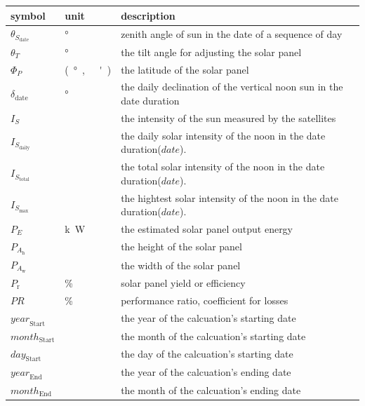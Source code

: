\documentclass[12pt]{article}
\begin{document}
\renewcommand{\arraystretch}{1.2}
\noindent \begin{longtable*}{l l p{12cm}} \toprule
  \textbf{symbol} & \textbf{unit} & \textbf{description}\\
\midrule 
$\theta_{S_{\text{date}}}$ & \si[per-mode=symbol] {\degree} & zenith angle of
sun in the date of a sequence of day
  \\
  $\theta_{T}$ & \si[per-mode=symbol] {\degree} & the tilt angle for adjusting
  the solar panel
  \\
  $\Phi_P$ & \si[per-mode=symbol] {(\degree, \ ')} & the latitude
   of the solar panel  
  \\
$\delta_{\text{date}}$ & \si[per-mode=symbol] {\degree} & the daily
declination of
the vertical noon sun in the date duration
  \\
  $I_{S}$ & \si[per-mode=symbol] {} & the intensity of
  the sun measured by the satellites
  \\
$I_{S_{\text{daily}}}$ & \si[per-mode=symbol] {} & the
daily
solar intensity of the noon in the date duration($date$).
  \\
$I_{S_{\text{total}}}$ & \si[per-mode=symbol] {} & the
total
solar intensity of the noon in the date duration($date$).
  \\
$I_{S_{\text{max}}}$ & \si[per-mode=symbol] {} & the
hightest
solar intensity of the noon in the date duration($date$).
  \\
  $P_{E}$ & \si[per-mode=symbol] {k\watt} &the estimated solar panel output
  energy
  \\
$P_{A_{\text{h}}}$ &\si[per-mode=symbol] {} & the height of the solar
panel
  \\
$P_{A_{\text{w}}}$ &\si[per-mode=symbol] {} &the width of the solar
panel
  \\
$P_{\text{r}}$ & \si[per-mode=symbol] {\%} & solar panel yield or efficiency
  \\
$PR$ & \si[per-mode=symbol] {\%} & performance ratio, coefficient for losses
  \\
$\mathit{year}_\text{Start}$& \si[per-mode=symbol] {\text{-}} & the year of the  calcuation's starting date\\
$\mathit{month}_\text{Start}$& \si[per-mode=symbol] {\text{-}} & the month of
  the calcuation's starting date\\ 
$\mathit{day}_\text{Start}$ & \si[per-mode=symbol] {\text{-}} & the day of the  calcuation's starting date\\
$\mathit{year}_\text{End}$ & \si[per-mode=symbol] {\text{-}} & the year of the  calcuation's ending date\\
$\mathit{month}_\text{End}$& \si[per-mode=symbol] {\text{-}} & the month of the  calcuation's ending date\\
\bottomrule
\end{longtable*}
\end{document}

